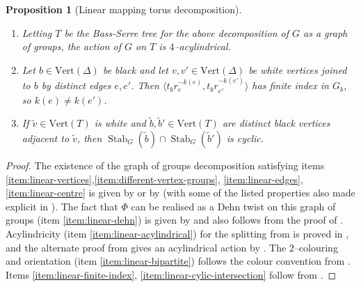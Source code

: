 \documentclass[11pt,oneside]{amsart}
\newtheorem{prop}[thm]{Proposition}
\theoremstyle{definition}
\DeclareMathOperator{\stabilizer}{Stab}
\newcommand{\vertices}{\mathrm{Vert}}
\begin{document}
\begin{prop}[Linear mapping torus decomposition]
\begin{enumerate}
\item Letting $T$ be the Bass-Serre tree for the above decomposition of $G$ as a graph of groups, the action of $G$ on $T$ is $4$--acylindrical.  \label{item:linear-acylindrical}

\item Let $b\in\vertices(\Delta)$ be black and let $v,v'\in\vertices(\Delta)$ be white vertices joined to $b$ by distinct edges $e,e'$.  Then $\langle t_{b}r_e^{-k(e)}, t_{b}r_{e'}^{-k(e')}\rangle$ has finite index in $G_b$, so $k(e)\neq k(e')$.\label{item:linear-finite-index}

\item If $\tilde v\in\vertices(T)$ is white and $\tilde b,\tilde b'\in\vertices(T)$ are distinct black vertices adjacent to $\tilde v$, then $\stabilizer_G(\tilde b)\cap\stabilizer_G(\tilde b')$ is cyclic.\label{item:linear-cylic-intersection}
 
\end{enumerate}
\end{prop}

\begin{proof}
The existence of the graph of groups decomposition satisfying items \eqref{item:linear-vertices},\eqref{item:different-vertex-groups},  \eqref{item:linear-edges}, \eqref{item:linear-centre} is given by \cite[Thm. 2.7, Cor. 2.9, Prop. 3.4]{DahmaniTouikan} or by \cite[Prop. 5.2.2]{AndrewMartino:splitting} (with some of the listed properties also made explicit in \cite[Lem. 4.4]{AndrewHughesKudlinska}).  The fact that $\Phi$ can be realised as a Dehn twist on this graph of groups (item \eqref{item:linear-dehn}) is given by \cite[Thm. 2.7]{DahmaniTouikan} and also follows from the proof of \cite[Prop. 5.2.2]{AndrewMartino:splitting}.  Acylindricity (item \eqref{item:linear-acylindrical}) for the splitting from \cite{AndrewMartino:splitting} is proved in \cite[Lem. 4.4]{AndrewHughesKudlinska}, and the alternate proof from \cite{DahmaniTouikan} gives an acylindrical action by \cite[Prop. 3.2, Prop. 3.4]{DahmaniTouikan}.  The $2$--colouring and orientation (item \eqref{item:linear-bipartite}) follows the colour convention from \cite{DahmaniTouikan}.  Items \eqref{item:linear-finite-index}, \eqref{item:linear-cylic-intersection} follow from \cite[Prop. 3.2, Prop. 3.4]{DahmaniTouikan}.
\end{proof}
\end{document}

